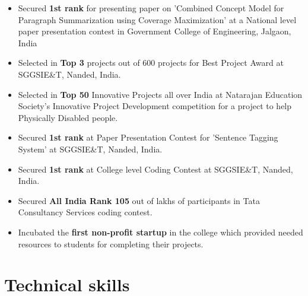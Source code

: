 \documentclass[11pt,a4paper,sans]{moderncv}        %
\begin{document}
\begin{itemize}
\item {Secured \textbf{1st rank} for presenting paper on 'Combined Concept Model for Paragraph Summarization using Coverage Maximization' at a National level paper presentation contest in Government College of Engineering, Jalgaon, India }
\vspace{5pt}
\item {Selected in \textbf{Top 3} projects out of 600 projects for Best Project Award at SGGSIE\&T, Nanded, India.}
\vspace{5pt}
\item {Selected in \textbf{Top 50} Innovative Projects all over India at Natarajan Education Society's
Innovative Project Development competition for a project to help Physically Disabled people.}
\vspace{5pt}
\item {Secured \textbf{1st rank} at Paper Presentation Contest for 'Sentence Tagging System' at SGGSIE&T, Nanded, India.}
\vspace{5pt}
\item {Secured \textbf{1st rank} at College level Coding Contest at SGGSIE&T, Nanded, India.}
\vspace{5pt}
\item {Secured \textbf{All India Rank 105} out of lakhs of participants in Tata Consultancy Services coding contest.}
\vspace{5pt}
\item {Incubated the \textbf{first non-profit startup} in the college which provided needed resources to students for completing their projects.}

\end{itemize}


\section{Technical skills}

\vspace{5pt}
\end{document}
